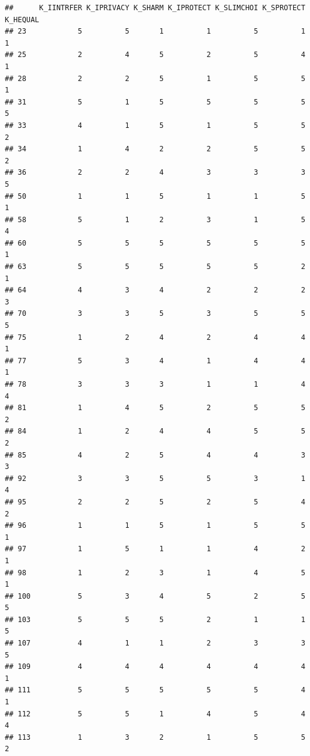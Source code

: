 \documentclass[
]{article}
\begin{document}
\begin{verbatim}
##      K_IINTRFER K_IPRIVACY K_SHARM K_IPROTECT K_SLIMCHOI K_SPROTECT K_HEQUAL
## 23            5          5       1          1          5          1        1
## 25            2          4       5          2          5          4        1
## 28            2          2       5          1          5          5        1
## 31            5          1       5          5          5          5        5
## 33            4          1       5          1          5          5        2
## 34            1          4       2          2          5          5        2
## 36            2          2       4          3          3          3        5
## 50            1          1       5          1          1          5        1
## 58            5          1       2          3          1          5        4
## 60            5          5       5          5          5          5        1
## 63            5          5       5          5          5          2        1
## 64            4          3       4          2          2          2        3
## 70            3          3       5          3          5          5        5
## 75            1          2       4          2          4          4        1
## 77            5          3       4          1          4          4        1
## 78            3          3       3          1          1          4        4
## 81            1          4       5          2          5          5        2
## 84            1          2       4          4          5          5        2
## 85            4          2       5          4          4          3        3
## 92            3          3       5          5          3          1        4
## 95            2          2       5          2          5          4        2
## 96            1          1       5          1          5          5        1
## 97            1          5       1          1          4          2        1
## 98            1          2       3          1          4          5        1
## 100           5          3       4          5          2          5        5
## 103           5          5       5          2          1          1        5
## 107           4          1       1          2          3          3        5
## 109           4          4       4          4          4          4        1
## 111           5          5       5          5          5          4        1
## 112           5          5       1          4          5          4        4
## 113           1          3       2          1          5          5        2

\end{verbatim}
\end{document}
